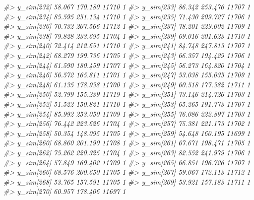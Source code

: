\documentclass[
  10pt,
  italian,
  a4paper,
  extrafontsizes,onecolumn,openright
  ]{memoir}
\newenvironment{Shaded}{\begin{snugshade}}{\end{snugshade}}
\newcommand{\CommentTok}[1]{\textcolor[rgb]{0.56,0.35,0.01}{\textit{#1}}}
\begin{document}
\begin{Shaded}
\begin{Highlighting}[]
\CommentTok{\#\textgreater{} y\_sim[232] 58.067 170.180 11710    1}
\CommentTok{\#\textgreater{} y\_sim[233] 86.342 253.476 11707    1}
\CommentTok{\#\textgreater{} y\_sim[234] 85.595 251.134 11710    1}
\CommentTok{\#\textgreater{} y\_sim[235] 71.430 209.727 11706    1}
\CommentTok{\#\textgreater{} y\_sim[236] 70.732 207.566 11712    1}
\CommentTok{\#\textgreater{} y\_sim[237] 78.201 229.002 11709    1}
\CommentTok{\#\textgreater{} y\_sim[238] 79.828 233.695 11704    1}
\CommentTok{\#\textgreater{} y\_sim[239] 69.016 201.623 11710    1}
\CommentTok{\#\textgreater{} y\_sim[240] 72.414 212.651 11710    1}
\CommentTok{\#\textgreater{} y\_sim[241] 84.748 247.813 11707    1}
\CommentTok{\#\textgreater{} y\_sim[242] 68.279 199.736 11705    1}
\CommentTok{\#\textgreater{} y\_sim[243] 66.357 194.429 11706    1}
\CommentTok{\#\textgreater{} y\_sim[244] 61.590 180.459 11707    1}
\CommentTok{\#\textgreater{} y\_sim[245] 56.273 164.820 11704    1}
\CommentTok{\#\textgreater{} y\_sim[246] 56.572 165.811 11701    1}
\CommentTok{\#\textgreater{} y\_sim[247] 53.038 155.035 11709    1}
\CommentTok{\#\textgreater{} y\_sim[248] 61.135 178.938 11700    1}
\CommentTok{\#\textgreater{} y\_sim[249] 60.518 177.382 11711    1}
\CommentTok{\#\textgreater{} y\_sim[250] 52.799 155.239 11719    1}
\CommentTok{\#\textgreater{} y\_sim[251] 73.146 214.726 11703    1}
\CommentTok{\#\textgreater{} y\_sim[252] 51.522 150.821 11710    1}
\CommentTok{\#\textgreater{} y\_sim[253] 65.265 191.773 11707    1}
\CommentTok{\#\textgreater{} y\_sim[254] 85.992 253.050 11709    1}
\CommentTok{\#\textgreater{} y\_sim[255] 76.086 222.897 11703    1}
\CommentTok{\#\textgreater{} y\_sim[256] 76.442 223.626 11704    1}
\CommentTok{\#\textgreater{} y\_sim[257] 75.381 221.173 11702    1}
\CommentTok{\#\textgreater{} y\_sim[258] 50.354 148.095 11705    1}
\CommentTok{\#\textgreater{} y\_sim[259] 54.648 160.195 11699    1}
\CommentTok{\#\textgreater{} y\_sim[260] 68.860 201.190 11708    1}
\CommentTok{\#\textgreater{} y\_sim[261] 67.671 198.471 11705    1}
\CommentTok{\#\textgreater{} y\_sim[262] 75.262 220.325 11704    1}
\CommentTok{\#\textgreater{} y\_sim[263] 82.552 241.979 11706    1}
\CommentTok{\#\textgreater{} y\_sim[264] 57.849 169.402 11709    1}
\CommentTok{\#\textgreater{} y\_sim[265] 66.851 196.726 11707    1}
\CommentTok{\#\textgreater{} y\_sim[266] 68.576 200.650 11705    1}
\CommentTok{\#\textgreater{} y\_sim[267] 59.067 172.113 11712    1}
\CommentTok{\#\textgreater{} y\_sim[268] 53.765 157.591 11705    1}
\CommentTok{\#\textgreater{} y\_sim[269] 53.921 157.183 11711    1}
\CommentTok{\#\textgreater{} y\_sim[270] 60.957 178.406 11697    1}

\end{Highlighting}
\end{Shaded}
\end{document}

